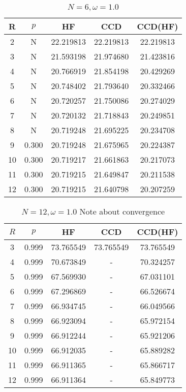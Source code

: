     
    
\begin{table}[H]
    \centering
    \caption{$N = 6, \omega = 1.0$}
    \begin{tabular}{ccccc}
    \toprule
    R & $p$ & HF & CCD & CCD(HF) \\
    \midrule
    2 & N & 22.219813 & 22.219813 & 22.219813 \\
    3 & N & 21.593198 & 21.974680 & 21.423816 \\
    4 & N & 20.766919 & 21.854198 & 20.429269 \\
    5 & N & 20.748402 & 21.793640 & 20.332466 \\
    6 & N & 20.720257 & 21.750086 & 20.274029 \\
    7 & N & 20.720132 & 21.718843 & 20.249851 \\
    8 & N & 20.719248 & 21.695225 & 20.234708 \\
    9 & 0.300 & 20.719248 & 21.675965 & 20.224387 \\
    10 & 0.300 & 20.719217 & 21.661863 & 20.217073 \\
    11 & 0.300 & 20.719215 & 21.649847 & 20.211538 \\
    12 & 0.300 & 20.719215 & 21.640798 & 20.207259 \\
    \bottomrule
    \end{tabular}
\end{table}
    
    
\begin{table}[H]
    \centering
    \caption{$N = 12, \omega = 1.0$ Note about convergence}
    \begin{tabular}{ccccc}
    \toprule
    $R$ & $p$ & HF & CCD & CCD(HF) \\
    \midrule
    3 & 0.999 & 73.765549 & 73.765549 & 73.765549 \\
    4 & 0.999 & 70.673849 & - & 70.324257 \\
    5 & 0.999 & 67.569930 & - & 67.031101 \\
    6 & 0.999 & 67.296869 & - & 66.526674 \\
    7 & 0.999 & 66.934745 & - & 66.049566 \\
    8 & 0.999 & 66.923094 & - & 65.972154 \\
    9 & 0.999 & 66.912244 & - & 65.921206 \\
    10 & 0.999 & 66.912035 & - & 65.889282 \\
    11 & 0.999 & 66.911365 & - & 65.866717 \\
    12 & 0.999 & 66.911364 & - & 65.849773 \\
    \bottomrule
    \end{tabular}
\end{table}

